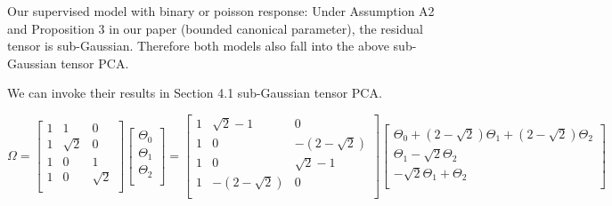 \documentclass[10pt]{article}
\theoremstyle{definition}
\theoremstyle{definition}
\theoremstyle{definition}
\begin{document}
Our supervised model with binary or poisson response: Under Assumption A2 and Proposition 3 in our paper (bounded canonical parameter), the residual tensor is sub-Gaussian. Therefore both models also fall into the above sub-Gaussian tensor PCA. 

We can invoke their results in Section 4.1 sub-Gaussian tensor PCA. 

\[
\Omega=\begin{bmatrix}
1 &1& 0 \\
1 &\sqrt{2}& 0\\
1 &0 &1\\
1 &0& \sqrt{2}\\
\end{bmatrix}
\begin{bmatrix}
\Theta_0 \\
\Theta_1 \\
\Theta_2 \\
\end{bmatrix}
=
\begin{bmatrix}
1 &\sqrt{2}-1& 0 \\
1 &0& -(2-\sqrt{2})\\
1 &0 &\sqrt{2}-1\\
1 &-(2-\sqrt{2})& 0\\
\end{bmatrix}
\begin{bmatrix}
\Theta_0+(2-\sqrt{2})\Theta_1+(2-\sqrt{2}) \Theta_2\\
\Theta_1-\sqrt{2}\Theta_2 \\
-\sqrt{2}\Theta_1+\Theta_2\\
\end{bmatrix}
\]
\end{document}

